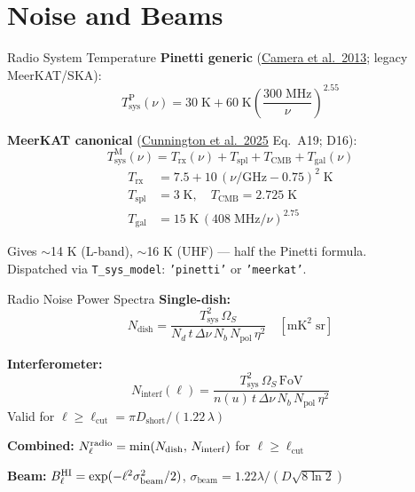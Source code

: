 \section{Noise and Beams}

\begin{frame}{Radio System Temperature}
\textbf{Pinetti generic} (\href{https://arxiv.org/abs/1305.6928}{Camera et al.\ 2013}; legacy MeerKAT/SKA):
\begin{equation}
T_{\mathrm{sys}}^{\mathrm{P}}(\nu) = 30\;\mathrm{K} + 60\;\mathrm{K}\left(\frac{300\;\mathrm{MHz}}{\nu}\right)^{\!2.55}
\end{equation}

\textbf{MeerKAT canonical} (\href{https://arxiv.org/abs/2510.27549}{Cunnington et al.\ 2025} Eq.~A19; D16):
\begin{equation}
T_{\mathrm{sys}}^{\mathrm{M}}(\nu) = T_{\mathrm{rx}}(\nu) + T_{\mathrm{spl}} + T_{\mathrm{CMB}} + T_{\mathrm{gal}}(\nu)
\end{equation}
\begin{align*}
T_{\mathrm{rx}} &= 7.5 + 10\,(\nu/\mathrm{GHz} - 0.75)^2\;\mathrm{K} \\
T_{\mathrm{spl}} &= 3\;\mathrm{K}, \quad T_{\mathrm{CMB}} = 2.725\;\mathrm{K} \\
T_{\mathrm{gal}} &= 15\;\mathrm{K}\,(408\;\mathrm{MHz}/\nu)^{2.75}
\end{align*}

Gives $\sim$14 K (L-band), $\sim$16 K (UHF) --- half the Pinetti formula.\\
Dispatched via \texttt{T\_sys\_model}: \texttt{'pinetti'} or \texttt{'meerkat'}.
\end{frame}

\begin{frame}{Radio Noise Power Spectra}
\textbf{Single-dish:}
\begin{equation}
N_{\mathrm{dish}} = \frac{T_{\mathrm{sys}}^2\,\Omega_S}{N_d\,t\,\Delta\nu\,N_b\,N_{\mathrm{pol}}\,\eta^2} \quad [\mathrm{mK}^2\;\mathrm{sr}]
\end{equation}

\textbf{Interferometer:}
\begin{equation}
N_{\mathrm{interf}}(\ell) = \frac{T_{\mathrm{sys}}^2\,\Omega_S\,\mathrm{FoV}}{n(u)\,t\,\Delta\nu\,N_b\,N_{\mathrm{pol}}\,\eta^2}
\end{equation}
Valid for $\ell \ge \ell_{\mathrm{cut}} = \pi D_{\mathrm{short}} / (1.22\,\lambda)$

\vspace{0.2cm}
\textbf{Combined:} $N_\ell^{\mathrm{radio}} = \min(N_{\mathrm{dish}},\, N_{\mathrm{interf}})$ for $\ell \ge \ell_{\mathrm{cut}}$

\vspace{0.2cm}
\textbf{Beam:} $B_\ell^{\mathrm{HI}} = \exp(-\ell^2\sigma_{\mathrm{beam}}^2/2)$, \quad $\sigma_{\mathrm{beam}} = 1.22\lambda / (D\sqrt{8\ln 2})$
\end{frame}

